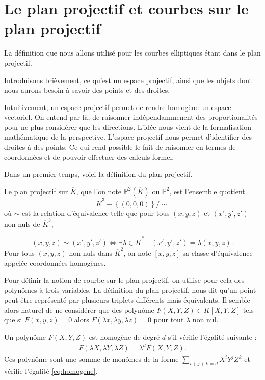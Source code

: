 \chapter{Le plan projectif et courbes sur le plan projectif}

La définition que nous allons utilisé pour les courbes elliptiques étant dans le plan
projectif.

Introduisons brièvement, ce qu'est un espace projectif, ainsi que les objets dont nous aurons
besoin à savoir des points et des droites.

Intuitivement, un espace projectif permet de rendre homogène un espace vectoriel. On entend
par là, de raisonner indépendammenent des proportionalités pour ne plus considérer que les
directions. L'idée nous vient de la formalisation mathématique de la perspective. 
L'espace projectif nous permet d'identifier des droites à des points. Ce qui rend possible
le fait de raisonner en termes de coordonnées et de pouvoir effectuer des calculs formel.

Dans un premier temps, voici la définition du plan projectif.

\begin{definition}
    Le plan projectif sur $\overline{K}$, que l'on note $\mathbb{P}^2(\overline{K})$ ou
    $\mathbb{P}^2$, est l'ensemble quotient
    \[
    \overline{K}^3 - \left\{ (0,0,0) \right\} / \sim
    \] 
    où $\sim$ est la relation d'équivalence telle que pour tous $\left( x,y,z \right) $ et
    $\left( x',y',z'\right) $ non nuls de $\overline{K}^3$,

    \[
    \left( x,y,z \right) \sim \left( x',y',z' \right) \iff \exists \lambda \in
    \overline{K}^{*} \quad \left( x',y',z' \right) = \lambda \left( x,y,z \right) 
    .\] 
    Pour tous $\left( x,y,z \right) $ non nuls dans $\overline{K}^2$, on note $\left[
    x,y,z \right] $ sa classe d'équivalence appelée coordonnées homogènes.
\end{definition}

Pour définir la notion de courbe sur le plan projectif, on utilise pour cela des polynômes à
trois variables. La définition du plan projectif, nous dit qu'un point peut être représenté par
plusieurs triplets différents mais équivalents. Il semble alors naturel de ne considérer
que des polynôme $F(X,Y,Z) \in K[X,Y,Z]$ tels que si $F(x,y,z) = 0$ alors $F(\lambda x, \lambda
y, \lambda z) = 0$ pour tout $\lambda$ non nul.

\begin{definition}
    Un polynôme $F(X,Y,Z)$ est homogène de degré $d$ s'il vérifie l'égalité suivante :
    \begin{align}
        \label{eq:homogene}
    F(\lambda X, \lambda Y, \lambda Z) = \lambda^{d}F(X,Y,Z)
    .\end{align}
    Ces polynôme sont une somme de monômes de la forme $\sum_{i+j+k=d} X^{i}Y^{j}Z^{k}$
    et vérifie l'égalité \eqref{eq:homogene}.
\end{definition}

